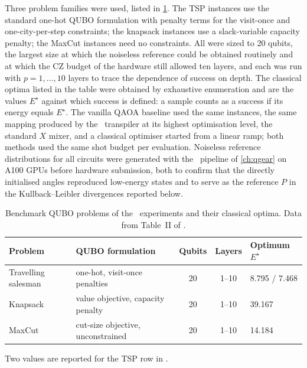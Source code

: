Three problem families were used, listed in \cref{tab:nisq:problems}. The TSP instances use the standard one-hot QUBO formulation with penalty terms for the visit-once and one-city-per-step constraints; the knapsack instances use a slack-variable capacity penalty; the MaxCut instances need no constraints. All were sized to 20 qubits, the largest size at which the noiseless reference could be obtained routinely and at which the CZ budget of the hardware still allowed ten layers, and each was run with $p=1,\dots,10$ layers to trace the dependence of success on depth. The classical optima listed in the table were obtained by exhaustive enumeration and are the values $E^{\star}$ against which success is defined: a sample counts as a success if its energy equals $E^{\star}$. The vanilla QAOA baseline used the same instances, the same mapping produced by the \qiskit\ transpiler at its highest optimisation level, the standard $X$ mixer, and a classical optimiser started from a linear ramp; both methods used the same shot budget per evaluation. Noiseless reference distributions for all circuits were generated with the \qgear\ pipeline of \cref{ch:qgear} on A100 GPUs before hardware submission, both to confirm that the directly initialised angles reproduced low-energy states and to serve as the reference $P$ in the Kullback--Leibler divergences reported below.

\begin{table}[htbp]
\caption{Benchmark QUBO problems of the \deal\ experiments and their classical optima. Data from Table~II of \cite{guo2025deal}.}
\label{tab:nisq:problems}
\centering\small
\begin{threeparttable}
\begin{tabular}{@{}llccl@{}}
\toprule
Problem & QUBO formulation & Qubits & Layers & Optimum $E^{\star}$ \\
\midrule
Travelling salesman & one-hot, visit-once penalties & 20 & 1--10 & 8.795 / 7.468\tnote{a} \\
Knapsack            & value objective, capacity penalty & 20 & 1--10 & 39.167 \\
MaxCut              & cut-size objective, unconstrained & 20 & 1--10 & 14.184 \\
\bottomrule
\end{tabular}
\begin{tablenotes}\footnotesize
\item[a] Two values are reported for the TSP row in \cite{guo2025deal}.
\end{tablenotes}
\end{threeparttable}
\end{table}

